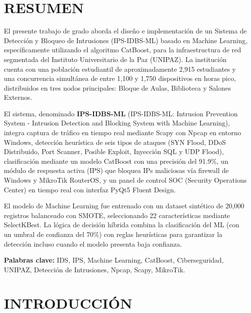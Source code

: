 \documentclass[12pt,letterpaper]{report}
\begin{document}
\newpage
\chapter*{RESUMEN}

El presente trabajo de grado aborda el diseño e implementación de un Sistema de Detección y Bloqueo de Intrusiones (IPS-IDBS-ML) basado en Machine Learning, específicamente utilizando el algoritmo CatBoost, para la infraestructura de red segmentada del Instituto Universitario de la Paz (UNIPAZ). La institución cuenta con una población estudiantil de aproximadamente 2,915 estudiantes y una concurrencia simultánea de entre 1,100 y 1,750 dispositivos en horas pico, distribuidos en tres nodos principales: Bloque de Aulas, Biblioteca y Salones Externos.

El sistema, denominado \textbf{IPS-IDBS-ML} (IPS-IDBS-ML: Intrusion Prevention System - Intrusion Detection and Blocking System with Machine Learning), integra captura de tráfico en tiempo real mediante Scapy con Npcap en entorno Windows, detección heurística de seis tipos de ataques (SYN Flood, DDoS Distribuido, Port Scanner, Posible Exploit, Inyección SQL y UDP Flood), clasificación mediante un modelo CatBoost con una precisión del 91.9\%, un módulo de respuesta activa (IPS) que bloquea IPs maliciosas vía firewall de Windows y MikroTik RouterOS, y un panel de control SOC (Security Operations Center) en tiempo real con interfaz PyQt5 Fluent Design.

El modelo de Machine Learning fue entrenado con un dataset sintético de 20,000 registros balanceado con SMOTE, seleccionando 22 características mediante SelectKBest. La lógica de decisión híbrida combina la clasificación del ML (con un umbral de confianza del 70\%) con reglas heurísticas para garantizar la detección incluso cuando el modelo presenta baja confianza.

\textbf{Palabras clave:} IDS, IPS, Machine Learning, CatBoost, Ciberseguridad, UNIPAZ, Detección de Intrusiones, Npcap, Scapy, MikroTik.

\newpage
\chapter{INTRODUCCIÓN}
\end{document}

